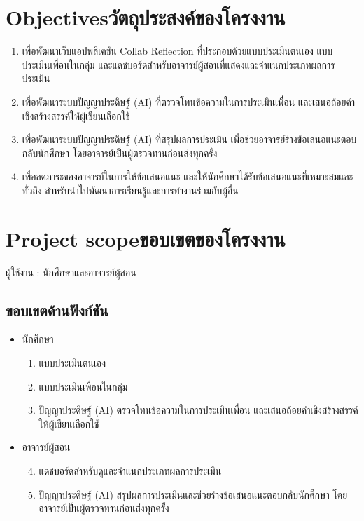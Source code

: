 \section{\ifenglish Objectives\else วัตถุประสงค์ของโครงงาน\fi}

\begin{enumerate}
  \item เพื่อพัฒนาเว็บแอปพลิเคชัน Collab Reflection ที่ประกอบด้วยแบบประเมินตนเอง แบบประเมินเพื่อนในกลุ่ม และแดชบอร์ดสำหรับอาจารย์ผู้สอนที่แสดงและจำแนกประเภทผลการประเมิน
  \item เพื่อพัฒนาระบบปัญญาประดิษฐ์ (AI) ที่ตรวจโทนข้อความในการประเมินเพื่อน และเสนอถ้อยคำเชิงสร้างสรรค์ให้ผู้เขียนเลือกใช้
  \item เพื่อพัฒนาระบบปัญญาประดิษฐ์ (AI) ที่สรุปผลการประเมิน เพื่อช่วยอาจารย์ร่างข้อเสนอแนะตอบกลับนักศึกษา โดยอาจารย์เป็นผู้ตรวจทานก่อนส่งทุกครั้ง
  \item เพื่อลดภาระของอาจารย์ในการให้ข้อเสนอแนะ และให้นักศึกษาได้รับข้อเสนอแนะที่เหมาะสมและทั่วถึง สำหรับนำไปพัฒนาการเรียนรู้และการทำงานร่วมกับผู้อื่น
\end{enumerate}

\section{\ifenglish Project scope\else ขอบเขตของโครงงาน\fi}

ผู้ใช้งาน : นักศึกษาและอาจารย์ผู้สอน

\subsection{ขอบเขตด้านฟังก์ชัน}

\begin{itemize}
  \item นักศึกษา
  \begin{enumerate}
    \item แบบประเมินตนเอง
    \item แบบประเมินเพื่อนในกลุ่ม
    \item ปัญญาประดิษฐ์ (AI) ตรวจโทนข้อความในการประเมินเพื่อน และเสนอถ้อยคำเชิงสร้างสรรค์ให้ผู้เขียนเลือกใช้
  \end{enumerate}
  \item อาจารย์ผู้สอน
  \begin{enumerate}
    \setcounter{enumii}{3}
    \item แดชบอร์ดสำหรับดูและจำแนกประเภทผลการประเมิน
    \item ปัญญาประดิษฐ์ (AI) สรุปผลการประเมินและช่วยร่างข้อเสนอแนะตอบกลับนักศึกษา โดยอาจารย์เป็นผู้ตรวจทานก่อนส่งทุกครั้ง
  \end{enumerate}
\end{itemize}

